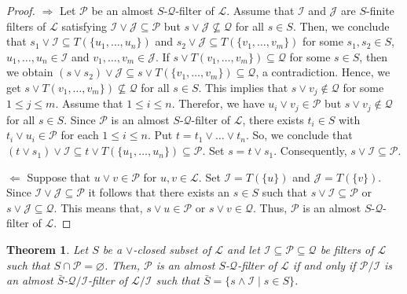 \documentclass[preprint,review,10pt]{amsart}
\newtheorem{theorem}{Theorem}[section]
\theoremstyle{definition}
\theoremstyle{remark}
\numberwithin{equation}{section}
\begin{document}
\begin{proof}
$\Longrightarrow$ Let $\mathcal{P}$ be an  almost $S$-$\mathcal{Q}$-filter of $\mathcal{L}$. Assume that $\mathcal{I}$ and $\mathcal{J}$ are $S$-finite filters of $\mathcal{L}$ satisfying $\mathcal{I} \vee \mathcal{J} \subseteq \mathcal{P}$ but $s \vee \mathcal{J} \nsubseteq \mathcal{Q}$ for all $s \in S$. Then, we conclude that $s_1 \vee \mathcal{I} \subseteq T(\{u_1,\ldots,u_n\})$ and $s_2 \vee \mathcal{J} \subseteq T(\{v_1,\ldots,v_m\})$ for some $s_1,s_2 \in S$, $u_1,\ldots,u_n \in \mathcal{I}$ and $v_1,\ldots,v_m \in \mathcal{J}$. If $s \vee T(v_1,\ldots,v_m\}) \subseteq \mathcal{Q}$ for some $s \in S$, then we obtain $(s \vee  s_2) \vee \mathcal{J} \subseteq s \vee T(\{v_1,\ldots,v_m\}) \subseteq \mathcal{Q}$, a contradiction.
 Hence, we get $s \vee T(v_1,\ldots,v_m\}) \nsubseteq \mathcal{Q}$ for all $s \in S$. This implies that $s \vee v_j \notin \mathcal{Q}$ for some $1 \leq j \leq m$. Assume that $1 \leq i \leq n$. Therefor, we have $u_i \vee v_j \in \mathcal{P}$ but $s \vee v_j \notin \mathcal{Q}$ for all $s \in S$.   Since $\mathcal{P}$ is  an  almost $S$-$\mathcal{Q}$-filter of $\mathcal{L}$, there exists $t_i \in S$ with $t_i \vee u_i  \in  \mathcal{P}$ for each $1 \leq i \leq n$. Put $t=t_1 \vee \ldots \vee t_n$. So, we conclude that $(t \vee s_1)\vee \mathcal{I} \subseteq t \vee T(\{u_1,\ldots,u_n\}) \subseteq \mathcal{P}$. Set $s=t \vee s_1$. Consequently, $s \vee \mathcal{I} \subseteq \mathcal{P}$.
 
 $\Longleftarrow$ Suppose that  $u \vee v \in \mathcal{P}$ for $u,v \in \mathcal{L}$. Set $\mathcal{I}=T(\{u\})$ and $\mathcal{J}=T(\{v\})$.  Since  $\mathcal{I} \vee \mathcal{J} \subseteq \mathcal{P}$ it follows that there exists an $s \in S$ such that  $s \vee \mathcal{I} \subseteq \mathcal{P}$ or  $s \vee \mathcal{J} \subseteq \mathcal{Q}$. This means that,  $s \vee u \in \mathcal{P}$ or  $s \vee v \in \mathcal{Q}$. Thus, $\mathcal{P}$ is an  almost $S$-$\mathcal{Q}$-filter of $\mathcal{L}$.
\end{proof}
\begin{theorem}
Let $S$ be a $\vee$-closed subset of $\mathcal{L}$ and let $\mathcal{I} \subseteq \mathcal{P} \subseteq \mathcal{Q}$  be    filters of $\mathcal{L}$ such that $S \cap \mathcal{P}=\varnothing$. Then, $ \mathcal{P}$ is an almost   $S$-$\mathcal{Q}$-filter of $\mathcal{L}$ if and only if  $\mathcal{P}/ \mathcal{I}$ is an almost $\bar{S}$-$\mathcal{Q}/ \mathcal{I}$-filter of $\mathcal{L}/ \mathcal{I}$ such that $\bar{S}=\{s \wedge \mathcal{I} \mid s \in S\}$.
\end{theorem}
\end{document}
